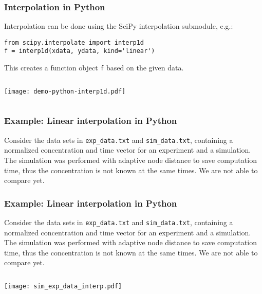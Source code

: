 {\nologo
\begin{frame}[fragile]
  \frametitle{Interpolation in Python}
  Interpolation can be done using the SciPy interpolation submodule, e.g.:
  \begin{lstlisting}
from scipy.interpolate import interp1d
f = interp1d(xdata, ydata, kind='linear')
  \end{lstlisting}
  This creates a function object \lstinline|f| based on the given data.\pause
  \begin{columns}[T]
        
    \pause
      
      \pause
    \pause
      \texttt{[image: demo-python-interp1d.pdf]}
  \end{columns}
\end{frame}
}

\begin{frame}[t,fragile]
  \frametitle{Example: Linear interpolation in Python}
  \footnotesize\selectfont
  Consider the data sets in \lstinline$exp_data.txt$ and \lstinline$sim_data.txt$, containing a normalized concentration and time vector for an experiment and a simulation. The simulation was performed with adaptive node distance to save computation time, thus the concentration is not known at the same times. We are not able to compare yet.
  \vfill
     \begin{tikzpicture}[domain=-1:6]
      
    \end{tikzpicture}
\end{frame}

{\nologo
\begin{frame}[t,fragile]
  \frametitle{Example: Linear interpolation in Python}
  \footnotesize\selectfont
  Consider the data sets in \lstinline$exp_data.txt$ and \lstinline$sim_data.txt$, containing a normalized concentration and time vector for an experiment and a simulation. The simulation was performed with adaptive node distance to save computation time, thus the concentration is not known at the same times. We are not able to compare yet.
  \vfill
 \begin{columns}
  
  \texttt{[image: sim\_exp\_data\_interp.pdf]}     
\end{columns}
\end{frame}
}

